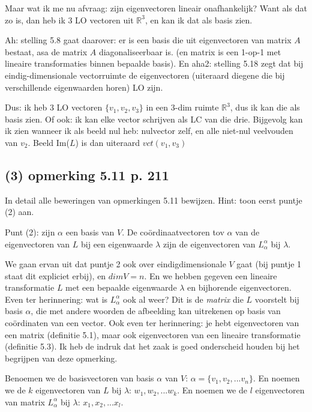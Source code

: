 \documentclass{article}
\begin{document}
Maar wat ik me nu afvraag: zijn eigenvectoren lineair onafhankelijk? Want als dat zo is, dan heb ik 3 LO vectoren uit $\mathbb{R}^3$, en kan ik dat als basis zien. 

Ah: stelling 5.8 gaat daarover: er is een basis die uit eigenvectoren van matrix $A$ bestaat, asa de matrix $A$ diagonaliseerbaar is. (en matrix is een 1-op-1 met lineaire transformaties binnen bepaalde basis). En aha2: stelling 5.18 zegt dat bij eindig-dimensionale vectorruimte de eigenvectoren (uiteraard diegene die bij verschillende eigenwaarden horen) LO zijn. 

Dus: ik heb 3 LO vectoren $\{ v_1, v_2, v_3 \}$ in een 3-dim ruimte $\mathbb{R}^3$, dus ik kan die als basis zien. Of ook: ik kan elke vector schrijven als LC van die drie. 
Bijgevolg kan ik zien wanneer ik als beeld nul heb: nulvector zelf, en alle niet-nul veelvouden van $v_2$. Beeld Im($L$) is dan uiteraard $vct(v_1, v_3)$

\subsection*{(3) opmerking 5.11 p. 211}

In detail alle beweringen van opmerkingen 5.11 bewijzen. 
Hint: toon eerst puntje (2) aan.

Punt (2): zijn $\alpha$ een basis van $V$. De co\"ordinaatvectoren tov $\alpha$ van de eigenvectoren van $L$ bij een eigenwaarde $\lambda$ zijn de eigenvectoren van $L_{\alpha}^{\alpha}$ bij $\lambda$.

We gaan ervan uit dat puntje 2 ook over eindigdimensionale $V$ gaat (bij puntje 1 staat dit expliciet erbij), en $dim V=n$. En we hebben gegeven een lineaire transformatie $L$ met een bepaalde eigenwaarde $\lambda$ en bijhorende eigenvectoren. 
Even ter herinnering: wat is $L_{\alpha}^{\alpha}$ ook al weer? Dit is de \emph{matrix} die $L$ voorstelt bij basis $\alpha$, die met andere woorden de afbeelding kan uitrekenen op basis van co\"ordinaten van een vector. 
Ook even ter herinnering: je hebt eigenvectoren van een matrix (definitie 5.1), maar ook eigenvectoren van een lineaire transformatie (definitie 5.3). Ik heb de indruk dat het zaak is goed onderscheid houden bij het begrijpen van deze opmerking. 

Benoemen we de basisvectoren van basis $\alpha$ van $V$: $\alpha=\{ v_1, v_2, ... v_n  \}$.
En noemen we de $k$ eigenvectoren van $L$ bij $\lambda$: $w_1, w_2, ... w_k $. 
En noemen we de $l$ eigenvectoren van matrix  $L_{\alpha}^{\alpha}$ bij $\lambda$: $x_1, x_2, ... x_l$. 
\end{document}

